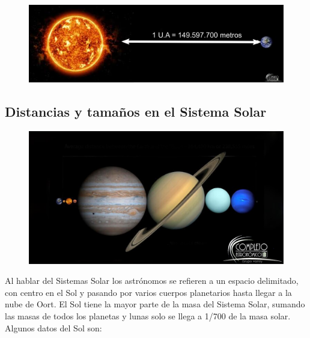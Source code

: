\documentclass[10pt,a4paper]{article}
\begin{document}
\begin{figure}[H]
\centering
\includegraphics[scale=0.18]{Imagenes/Unidad_astro_01}
\end{figure}
  
  
\subsection{Distancias y tamaños en el Sistema Solar}
\begin{figure}[H]
\centering
\includegraphics[scale=0.18]{Imagenes/Tamanos_01}
\end{figure}
Al hablar del Sistemas Solar los astrónomos se refieren a un espacio delimitado, con centro en el Sol y pasando por varios cuerpos planetarios hasta llegar a la nube de Oort. El Sol tiene la mayor parte de la masa del Sistema Solar, sumando las masas de todos los planetas y lunas solo se llega a 1/700 de la masa solar. Algunos datos del Sol son:
\end{document}

